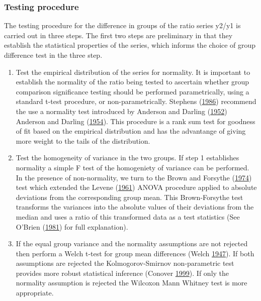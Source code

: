 \documentclass[12pt,]{article}
\begin{document}
\hypertarget{TestSteps}{%
\subsubsection{Testing procedure}\label{TestSteps}}

The testing procedure for the difference in groups of the ratio series y2/y1 is carried out in three steps. The first two steps are preliminary in that they establish the statistical properties of the series, which informs the choice of group difference test in the three step.

\begin{enumerate}
\def\labelenumi{\arabic{enumi}.}
\item
  Test the empirical distribution of the series for normality. It is important to establish the normality of the ratio being tested to ascertain whether group comparison significance testing should be performed parametrically, using a standard t-test procedure, or non-parametrically. Stephens (\protect\hyperlink{ref-Stephens1986}{1986}) recommend the use a normality test introduced by Anderson and Darling (\protect\hyperlink{ref-Anderson1952}{1952}) Anderson and Darling (\protect\hyperlink{ref-Anderson1954}{1954}). This procedure is a rank sum test for goodness of fit based on the empirical distribution and has the advantange of giving more weight to the tails of the distribution.
\item
  Test the homogeneity of variance in the two groups. If step 1 establishes normality a simple F test of the homogeniety of variance can be performed. In the presence of non-normality, we turn to the Brown and Forsythe (\protect\hyperlink{ref-Brown1974}{1974}) test which extended the Levene (\protect\hyperlink{ref-Levene1961}{1961}) ANOVA procedure applied to absolute deviations from the corresponding group mean. This Brown-Forsythe test transforms the variances into the absolute values of their deviations from the median and uses a ratio of this transformed data as a test statistics (See O'Brien (\protect\hyperlink{ref-OBrien1981}{1981}) for full explanation).
\item
  If the equal group variance and the normality assumptions are not rejected then perform a Welch t-test for group mean differences (Welch \protect\hyperlink{ref-Welch1947}{1947}). If both assumptions are rejected the Kolmogorov-Smirnov non-parametric test provides more robust statistical inference (Conover \protect\hyperlink{ref-Conover1999}{1999}). If only the normality assumption is rejected the Wilcoxon Mann Whitney test is more appropriate.
\end{enumerate}
\end{document}
